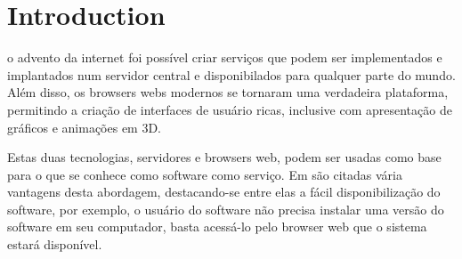 \documentclass[journal]{IEEEtran}
\begin{document}
\section{Introduction}
% 
% 
% 
% 
 o advento da internet foi possível criar serviços 
que podem ser implementados e implantados num servidor central e 
disponibilados para qualquer parte do mundo. 
Além disso, os browsers webs modernos se tornaram uma verdadeira plataforma,
permitindo a criação de interfaces de usuário ricas, inclusive com apresentação 
de gráficos e animações em 3D. 

Estas duas tecnologias, servidores e browsers web, podem ser 
usadas como base para o que se conhece como software como serviço. 
Em \cite{Fox2012} são citadas vária vantagens desta abordagem, 
destacando-se entre elas a fácil disponibilização do software,
por exemplo, o usuário do software não precisa instalar uma 
versão do software em seu computador, basta acessá-lo pelo
browser web que o sistema estará disponível.
\end{document}

